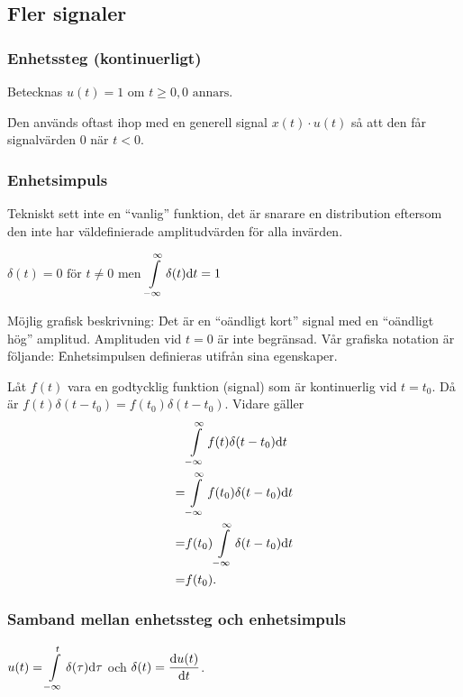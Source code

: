 \documentclass[a4paper]{article}
\begin{document}
\providecommand\fname{}
\renewcommand\fname{19-09-05}

\subsection{Fler signaler}
\subsubsection{Enhetssteg (kontinuerligt)}
Betecknas \(
    u(t) = 1 \text{ om } t \geq 0, 0 \text{ annars} 
\).

\f

Den används oftast ihop med en generell signal \(
    x(t)\cdot u(t)
\) så att den får signalvärden \(
    0
\) när \(
    t < 0
\).

\subsubsection{Enhetsimpuls}
Tekniskt sett inte en \enquote{vanlig} funktion, det är snarare en distribution eftersom 
den inte har väldefinierade amplitudvärden för alla invärden.

\begin{defn}
    \(
        \delta(t) = 0 \text{ för } t \neq 0
    \) men \(
        \displaystyle\int\limits_{-\infty}^{\infty} \delta(t) \dd t = 1
    \) 
\end{defn}

Möjlig grafisk beskrivning: \f

Det är en \enquote{oändligt kort} signal med en \enquote{oändligt hög} 
amplitud. Amplituden vid \(
    t = 0
\) är inte begränsad. Vår grafiska notation är följande: \f

Enhetsimpulsen definieras utifrån sina egenskaper.

Låt \(
    f(t)
\) vara en godtycklig funktion (signal) som är kontinuerlig vid \(
    t = t_0
\). Då är \(
    f(t)\delta(t-t_0) = f(t_0)\delta(t-t_0)
\). Vidare gäller 
\begin{align*}
    &\displaystyle\int\limits_{-\infty}^{\infty} f(t)\delta(t-t_0)\dd t \\
    =& \displaystyle\int\limits_{-\infty}^{\infty} f(t_0)\delta(t-t_0)\dd t\\
    =& f(t_0) \displaystyle\int\limits_{-\infty}^{\infty} \delta(t-t_0)\dd t\\
    =& f(t_0)\text{.} 
\end{align*}

\subsubsection{Samband mellan enhetssteg och enhetsimpuls}
\(
    u(t) = \displaystyle\int\limits_{-\infty}^{t} \delta(\tau)\dd \tau
\) och \(
    \delta(t) = \displaystyle\dv{u(t)}{t}
\).
\end{document}
